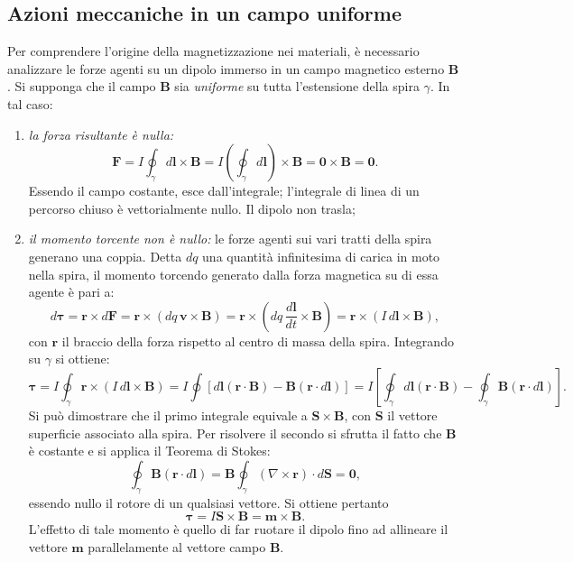 \documentclass[a4paper,11pt]{report}
\begin{document}
\subsection{Azioni meccaniche in un campo uniforme}
Per comprendere l'origine della magnetizzazione nei materiali, è necessario analizzare le forze agenti su un dipolo immerso in un campo magnetico esterno $\bm{B}$.
Si supponga che il campo $\bm{B}$ sia \textit{uniforme} su tutta l'estensione della spira $\gamma$. In tal caso:
\begin{enumerate}
    \item \textit{la forza risultante è nulla:}
    \begin{equation}
        \bm{F} = I \oint_{\gamma} d\bm{l} \times \bm{B} = I \left( \oint_{\gamma} d\bm{l} \right) \times \bm{B} = \bm{0} \times \bm{B} = \bm{0}.
    \end{equation}
    Essendo il campo costante, esce dall'integrale; l'integrale di linea di un percorso chiuso è vettorialmente nullo. Il dipolo non trasla;

    \item \textit{il momento torcente non è nullo:}
    le forze agenti sui vari tratti della spira generano una coppia. Detta $dq$ una quantità infinitesima di carica in moto nella spira, il momento torcendo generato dalla forza magnetica su di essa agente è pari a:
        \begin{equation}
        d\bm{\tau} = \bm{r} \times d\bm{F} = \bm{r} \times (dq \,\bm{v} \times \bm{B}) = \bm{r} \times (dq \,\frac{d\bm{l}}{dt} \times \bm{B}) = \bm{r} \times (I \,d\bm{l} \times \bm{B}),
    \end{equation}
    con $\bm{r}$ il braccio della forza rispetto al centro di massa della spira. Integrando su $\gamma$ si ottiene:
            \begin{equation}
        \bm{\tau} = I\oint_{\gamma} \bm{r} \times (I \,d\bm{l} \times \bm{B}) = I \oint [d\bm{l}(\bm{r}\cdot \bm{B}) - \bm{B}(\bm{r}\cdot d\bm{l})] = I\left[ \oint_{\gamma}d\bm{l}(\bm{r}\cdot \bm{B}) - \oint_{\gamma} \bm{B}(\bm{r}\cdot d\bm{l})\right].
    \end{equation}
    Si può dimostrare che il primo integrale equivale a $\bm{S} \times \bm{B}$, con $\bm{S}$ il vettore superficie associato alla spira. Per risolvere il secondo si sfrutta il fatto che $\bm{B}$ è costante e si applica il Teorema di Stokes:
                \begin{equation}
         \oint_{\gamma} \bm{B}(\bm{r}\cdot d\bm{l}) = \bm{B}\oint_{\gamma} (\nabla \times \bm{r})\cdot d\bm{S} = \bm{0},
    \end{equation}
    essendo nullo il rotore di un qualsiasi vettore. Si ottiene pertanto
    \begin{equation}
        \bm{\tau} = I \bm{S} \times \bm{B} = \bm{m} \times \bm{B}.
    \end{equation}
    L'effetto di tale momento è quello di far ruotare il dipolo fino ad allineare il vettore $\bm{m}$ parallelamente al vettore campo $\bm{B}$.
\end{enumerate}
\end{document}
